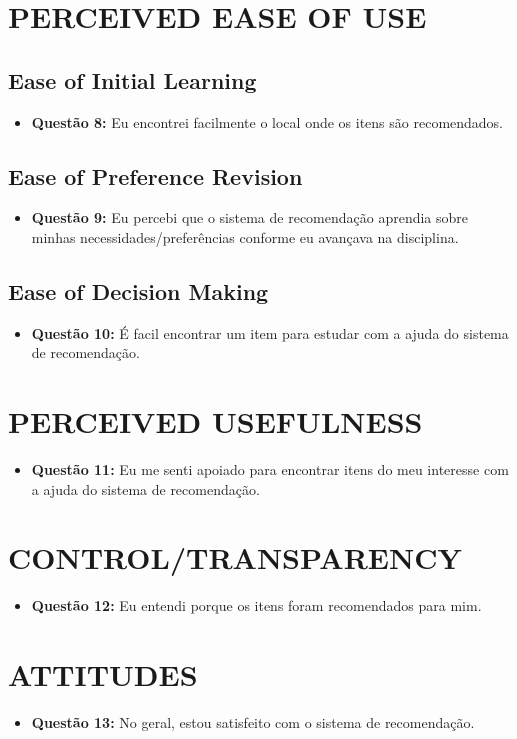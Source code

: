 \section{PERCEIVED EASE OF USE}
\subsection{Ease of Initial Learning}
\begin{itemize}
\item \textbf{Questão 8:} Eu encontrei facilmente o local onde os itens são recomendados.
\end{itemize}
\subsection{Ease of Preference Revision}
\begin{itemize}
\item \textbf{Questão 9:} Eu percebi que o sistema de recomendação aprendia sobre minhas necessidades/preferências conforme eu avançava na disciplina.
\end{itemize}
\subsection{Ease of Decision Making}
\begin{itemize}
\item \textbf{Questão 10:} É facil encontrar um item para estudar com a ajuda do sistema de recomendação.
\end{itemize}
\section{PERCEIVED USEFULNESS}
\begin{itemize}
\item \textbf{Questão 11:} Eu me senti apoiado para encontrar itens do meu interesse com a ajuda do sistema de recomendação.
\end{itemize}
\section{CONTROL/TRANSPARENCY}
\begin{itemize}
\item \textbf{Questão 12:} Eu entendi porque os itens foram recomendados para mim.
\end{itemize}
\section{ATTITUDES}
\begin{itemize}
\item \textbf{Questão 13:} No geral, estou satisfeito com o sistema de recomendação.
\end{itemize}
